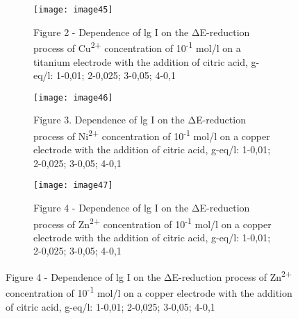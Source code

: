 \begin{figure}[H]
    \centering
    \begin{subfigure}[b]{0.45\textwidth}
        \centering
        \texttt{[image: image45]}
        \caption*{Figure 2 - Dependence of lg I on the ΔE-reduction process of
        Cu\textsuperscript{2+} concentration of 10\textsuperscript{-1} mol/l on
        a titanium electrode with the addition of citric acid, g-eq/l: 1-0,01;
        2-0,025; 3-0,05; 4-0,1}
    \end{subfigure}
    \hfill
    \begin{subfigure}[b]{0.45\textwidth}
        \centering
        \texttt{[image: image46]}
        \caption*{Figure 3. Dependence of lg I on the ΔE-reduction process of
        Ni\textsuperscript{2+} concentration of 10\textsuperscript{-1} mol/l on
        a copper electrode with the addition of citric acid, g-eq/l: 1-0,01;
        2-0,025; 3-0,05; 4-0,1}
    \end{subfigure}
    \begin{subfigure}[b]{0.45\textwidth}
        \centering
        \texttt{[image: image47]}
        \caption*{Figure 4 - Dependence of lg I on the ΔE-reduction process of
        Zn\textsuperscript{2+} concentration of 10\textsuperscript{-1} mol/l on
        a copper electrode with the addition of citric acid, g-eq/l: 1-0,01;
        2-0,025; 3-0,05; 4-0,1}
    \end{subfigure}
\end{figure}

